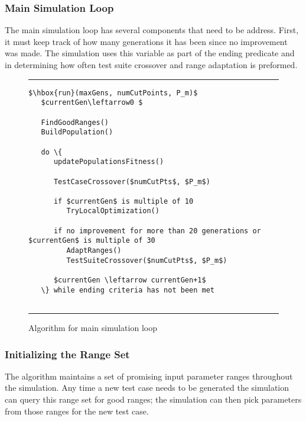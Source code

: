 \documentclass[runningheads]{llncs}
\begin{document}
\subsubsection{Main Simulation Loop}

The main simulation loop has several components that need to be address. First, it must keep track of how many generations it has been since no improvement was made. The simulation uses this variable as part of the ending predicate and in determining how often test suite crossover and range adaptation is preformed.

\begin{figure}[h!]
\begin{center}
\hrule
\medskip
\begin{Verbatim}[fontfamily=tt, xleftmargin=10pt, commandchars=\\\{\},
codes={\catcode`$=3\catcode`^=7\catcode`_=8}]
$\hbox{run}(maxGens, numCutPoints, P_m)$
   $currentGen\leftarrow0 $

   FindGoodRanges()
   BuildPopulation()

   do \{
      updatePopulationsFitness()

      TestCaseCrossover($numCutPts$, $P_m$)

      if $currentGen$ is multiple of 10
         TryLocalOptimization()

      if no improvement for more than 20 generations or $currentGen$ is multiple of 30 
         AdaptRanges() 
         TestSuiteCrossover($numCutPts$, $P_m$) 

      $currentGen \leftarrow currentGen+1$
   \} while ending criteria has not been met
	
\end{Verbatim}
\hrule
\end{center}
\caption{Algorithm for main simulation loop \label{fig:simLoopAlt}}
\end{figure}
\FloatBarrier

\subsubsection{Initializing the Range Set}

The algorithm maintains a set of promising input parameter ranges throughout the simulation. Any time a new test case needs to be generated the simulation can query this range set for good ranges; the simulation can then pick parameters from those ranges for the new test case. 
\end{document}
